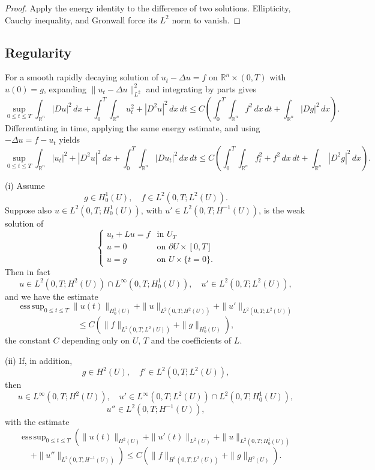 \begin{proof}
\sketch Apply the energy identity to the difference of two solutions. Ellipticity, Cauchy inequality, and Gronwall force its $L^2$ norm to vanish.
\end{proof}

\subsection{Regularity}

\begin{remark}
\label{rem:parabolic-regularity-motivation}
For a smooth rapidly decaying solution of $u_t-\Delta u=f$ on $\mathbb R^n\times(0,T)$ with $u(0)=g$, expanding $\|u_t-\Delta u\|_{L^2}^2$ and integrating by parts gives
\[
\sup_{0\le t\le T}\int_{\mathbb R^n}|Du|^2\,dx
+\int_0^T\int_{\mathbb R^n}u_t^2+|D^2u|^2\,dx\,dt
\le C\left(\int_0^T\int_{\mathbb R^n}f^2\,dx\,dt+\int_{\mathbb R^n}|Dg|^2\,dx\right).
\tag{39}
\]
Differentiating in time, applying the same energy estimate, and using $-\Delta u=f-u_t$ yields
\[
\sup_{0\le t\le T}\int_{\mathbb R^n}|u_t|^2+|D^2u|^2\,dx
+\int_0^T\int_{\mathbb R^n}|Du_t|^2\,dx\,dt
\le C\left(\int_0^T\int_{\mathbb R^n}f_t^2+f^2\,dx\,dt+\int_{\mathbb R^n}|D^2g|^2\,dx\right).
\tag{44}
\]
\end{remark}

\begin{theorem}
\label{thm:parabolic-improved-regularity}

(i) Assume
\[
g \in H_0^1(U), \quad f \in L^2(0,T; L^2(U)).
\]
Suppose also $u \in L^2(0,T; H_0^1(U))$, with $u' \in L^2(0,T; H^{-1}(U))$, is the weak solution of
\[
\begin{cases}
u_t + Lu = f & \text{in } U_T \\
u = 0 & \text{on } \partial U \times [0,T] \\
u = g & \text{on } U \times \{t = 0\}.
\end{cases}
\]
Then in fact
\[
u \in L^2(0,T; H^2(U)) \cap L^\infty(0,T; H_0^1(U)), \quad u' \in L^2(0,T; L^2(U)),
\]
and we have the estimate
\[
\operatorname{ess\,sup}_{0 \leq t \leq T} \|u(t)\|_{H_0^1(U)} + \|u\|_{L^2(0,T; H^2(U))} + \|u'\|_{L^2(0,T; L^2(U))}
\]
\[
\leq C \left( \|f\|_{L^2(0,T; L^2(U))} + \|g\|_{H_0^1(U)} \right),
\tag{46}
\]
the constant $C$ depending only on $U$, $T$ and the coefficients of $L$.

(ii) If, in addition,
\[
g \in H^2(U), \quad f' \in L^2(0,T;L^2(U)),
\]
then
\[
u \in L^\infty(0,T;H^2(U)), \quad u' \in L^\infty(0,T;L^2(U)) \cap L^2(0,T;H_0^1(U)),
\]
\[
u'' \in L^2(0,T;H^{-1}(U)),
\]
with the estimate
\[
\operatorname{ess\,sup}_{0 \leq t \leq T} \left( \|u(t)\|_{H^2(U)} + \|u'(t)\|_{L^2(U)} + \|u\|_{L^2(0,T;H_0^1(U))} \right.
\]
\[
\left. + \|u''\|_{L^2(0,T;H^{-1}(U))} \right) \leq C \left( \|f\|_{H^1(0,T;L^2(U))} + \|g\|_{H^2(U)} \right).
\tag{47}
\]
\end{theorem}

